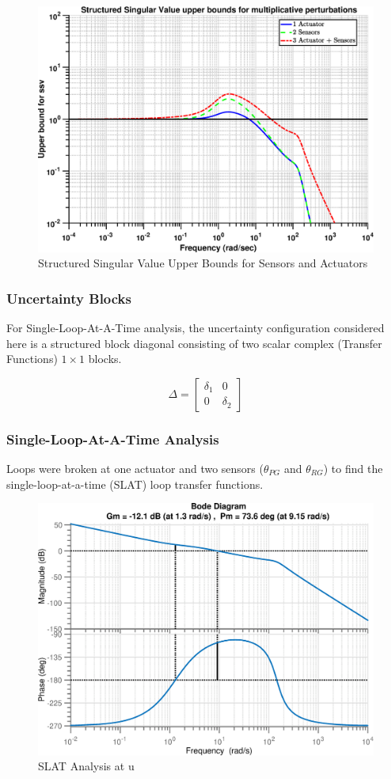 \documentclass[12pt]{article}
\begin{document}
	\begin{figure}[H]
		\centering
		\includegraphics[width=0.9\linewidth]{SSVUpperBNDS}
		\caption{Structured Singular Value Upper Bounds for Sensors and Actuators}
		\label{fig:SSVUpperBNDS}
	\end{figure}
	
	\subsubsection{Uncertainty Blocks}
	For Single-Loop-At-A-Time analysis, the uncertainty configuration considered here is a structured block diagonal consisting of two scalar complex (Transfer Functions) $1\times1$ blocks.
	
	\begin{equation}
	\Delta = \begin{bmatrix}
	\delta_{1} &0\\
	0 & \delta_{2}
	\end{bmatrix}
	\end{equation}
	
	\subsubsection{Single-Loop-At-A-Time Analysis}
	Loops were broken at one actuator and two sensors ($\theta_{PG}$ and $\theta_{RG}$) to find the single-loop-at-a-time (SLAT) loop transfer functions. 
	
	\begin{figure}[H]
		\centering
		\includegraphics[width=0.8\linewidth]{InputLoopBode_SLAT_U}
		\caption{SLAT Analysis at u}
		\label{fig:inputloopbodeslatu}
	\end{figure}
	
\end{document}
